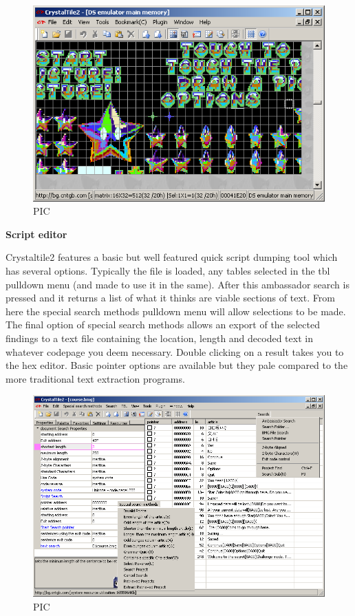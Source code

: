 \documentclass[
]{book}
\begin{document}
\begin{figure}
\centering
\includegraphics{images/227_home_fast6191_romhackingguide_unrenamed_fil___inal_borders_romhackguidecrystaltile2usage8.png}
\caption{PIC}
\end{figure}

\textbf{Script editor}

Crystaltile2 features a basic but well featured quick script dumping tool which has several options. Typically the file is loaded, any tables selected in the tbl pulldown menu (and made to use it in the same). After this ambassador search is pressed and it returns a list of what it thinks are viable sections of text. From here the special search methods pulldown menu will allow selections to be made. The final option of special search methods allows an export of the selected findings to a text file containing the location, length and decoded text in whatever codepage you deem necessary. Double clicking on a result takes you to the hex editor. Basic pointer options are available but they pale compared to the more traditional text extraction programs.

\begin{figure}
\centering
\includegraphics{images/228_home_fast6191_romhackingguide_unrenamed_fil___inal_borders_romhackguidecrystaltile2usage9.png}
\caption{PIC}
\end{figure}
\end{document}
